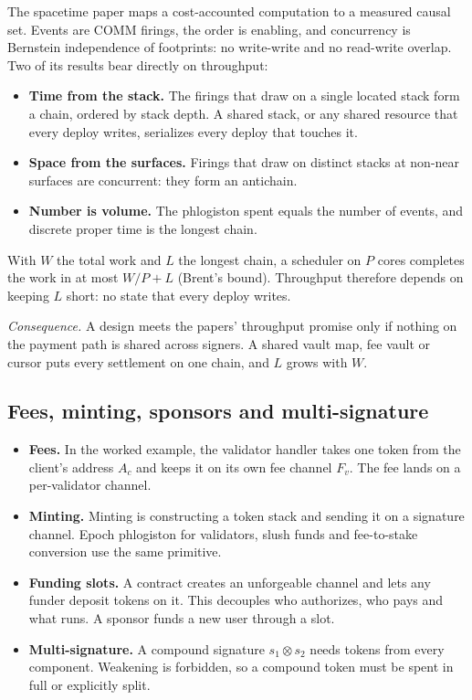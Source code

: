 \documentclass[11pt]{article}
\begin{document}
The spacetime paper maps a cost-accounted computation to a measured causal set. Events are COMM firings, the order is enabling, and concurrency is Bernstein independence of footprints: no write-write and no read-write overlap. Two of its results bear directly on throughput:
\begin{itemize}
\item \textbf{Time from the stack.} The firings that draw on a single located stack form a chain, ordered by stack depth. A shared stack, or any shared resource that every deploy writes, serializes every deploy that touches it.
\item \textbf{Space from the surfaces.} Firings that draw on distinct stacks at non-near surfaces are concurrent: they form an antichain.
\item \textbf{Number is volume.} The phlogiston spent equals the number of events, and discrete proper time is the longest chain.
\end{itemize}
With $W$ the total work and $L$ the longest chain, a scheduler on $P$ cores completes the work in at most $W/P + L$ (Brent's bound). Throughput therefore depends on keeping $L$ short: no state that every deploy writes.

\emph{Consequence.} A design meets the papers' throughput promise only if nothing on the payment path is shared across signers. A shared vault map, fee vault or cursor puts every settlement on one chain, and $L$ grows with $W$.

\subsection{Fees, minting, sponsors and multi-signature}

\begin{itemize}
\item \textbf{Fees.} In the worked example, the validator handler takes one token from the client's address $A_c$ and keeps it on its own fee channel $F_v$. The fee lands on a per-validator channel.
\item \textbf{Minting.} Minting is constructing a token stack and sending it on a signature channel. Epoch phlogiston for validators, slush funds and fee-to-stake conversion use the same primitive.
\item \textbf{Funding slots.} A contract creates an unforgeable channel and lets any funder deposit tokens on it. This decouples who authorizes, who pays and what runs. A sponsor funds a new user through a slot.
\item \textbf{Multi-signature.} A compound signature $s_1 \otimes s_2$ needs tokens from every component. Weakening is forbidden, so a compound token must be spent in full or explicitly split.
\end{itemize}
\end{document}
